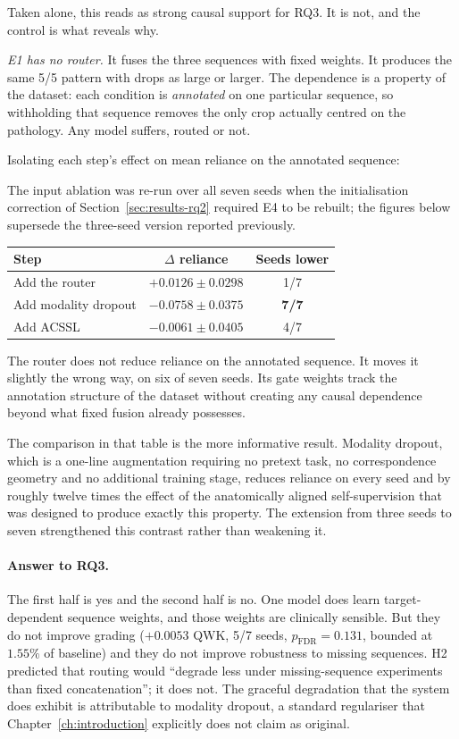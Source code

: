 \documentclass[12pt,a4paper]{report}
\begin{document}
Taken alone, this reads as strong causal support for RQ3. It is not, and the
control is what reveals why.

\emph{E1 has no router.} It fuses the three sequences with fixed weights. It
produces the same 5/5 pattern with drops as large or larger. The dependence is a
property of the dataset: each condition is \emph{annotated} on one particular
sequence, so withholding that sequence removes the only crop actually centred on
the pathology. Any model suffers, routed or not.

Isolating each step's effect on mean reliance on the annotated sequence:

The input ablation was re-run over all seven seeds when the initialisation
correction of Section~\ref{sec:results-rq2} required E4 to be rebuilt; the
figures below supersede the three-seed version reported previously.

\begin{center}
\begin{tabular}{lcc}
\toprule
Step & $\Delta$ reliance & Seeds lower \\
\midrule
Add the router             & $+0.0126 \pm 0.0298$ & 1/7 \\
Add modality dropout       & $\mathbf{-0.0758 \pm 0.0375}$ & \textbf{7/7} \\
Add ACSSL                  & $-0.0061 \pm 0.0405$ & 4/7 \\
\bottomrule
\end{tabular}
\end{center}

The router does not reduce reliance on the annotated sequence. It moves it
slightly the wrong way, on six of seven seeds. Its gate weights track the
annotation structure of the dataset without creating any causal dependence
beyond what fixed fusion already possesses.

The comparison in that table is the more informative result. Modality dropout,
which is a one-line augmentation requiring no pretext task, no correspondence
geometry and no additional training stage, reduces reliance on every seed and by
roughly twelve times the effect of the anatomically aligned self-supervision
that was designed to produce exactly this property. The extension from three
seeds to seven strengthened this contrast rather than weakening it.

\paragraph{Answer to RQ3.} The first half is yes and the second half is no. One
model does learn target-dependent sequence weights, and those weights are
clinically sensible. But they do not improve grading ($+0.0053$ QWK, 5/7 seeds,
$p_{\mathrm{FDR}} = 0.131$, bounded at $1.55\%$ of baseline)
and they do not improve robustness to missing sequences. H2 predicted that
routing would \enquote{degrade less under missing-sequence experiments than fixed
concatenation}; it does not. The graceful degradation that the system does
exhibit is attributable to modality dropout, a standard regulariser that
Chapter~\ref{ch:introduction} explicitly does not claim as original.
\end{document}
